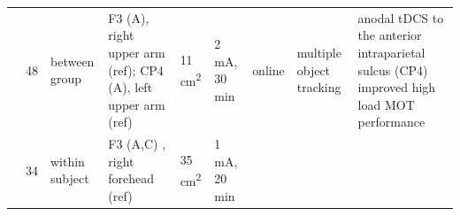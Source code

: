 \documentclass[11pt,]{memoir}
\begin{document}
\begin{longtable}[]{@{}lllllllll@{}}
\begin{minipage}[t]{0.08\columnwidth}
\textcite{Blumberg2015}\strut
\end{minipage} & \begin{minipage}[t]{0.03\columnwidth}\raggedright
48\strut
\end{minipage} & \begin{minipage}[t]{0.05\columnwidth}\raggedright
between
group\strut
\end{minipage} & \begin{minipage}[t]{0.12\columnwidth}\raggedright
F3 (A), right upper
arm (ref); CP4 (A),
left upper arm (ref)\strut
\end{minipage} & \begin{minipage}[t]{0.04\columnwidth}\raggedright
11
cm\textsuperscript{2}\strut
\end{minipage} & \begin{minipage}[t]{0.05\columnwidth}\raggedright
2 mA,
30 min\strut
\end{minipage} & \begin{minipage}[t]{0.05\columnwidth}\raggedright
online\strut
\end{minipage} & \begin{minipage}[t]{0.08\columnwidth}\raggedright
multiple
object
tracking\strut
\end{minipage} & \begin{minipage}[t]{0.27\columnwidth}\raggedright
anodal tDCS to the anterior intraparietal sulcus
(CP4) improved high load MOT performance\strut
\end{minipage}\tabularnewline
\begin{minipage}[t]{0.08\columnwidth}\raggedright
\textcite{London2015}\strut
\end{minipage} & \begin{minipage}[t]{0.03\columnwidth}\raggedright
34\strut
\end{minipage} & \begin{minipage}[t]{0.05\columnwidth}\raggedright
within
subject\strut
\end{minipage} & \begin{minipage}[t]{0.12\columnwidth}\raggedright
F3 (A,C) , right
forehead (ref)\strut
\end{minipage} & \begin{minipage}[t]{0.04\columnwidth}\raggedright
35
cm\textsuperscript{2}\strut
\end{minipage} & \begin{minipage}[t]{0.05\columnwidth}\raggedright
1 mA,
20 min\strut
\end{minipage} & \begin{minipage}[t]{0.05\columnwidth}\raggedright

\end{minipage}
\end{longtable}
\end{document}
